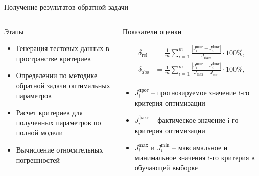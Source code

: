 \begin{frame}{Получение результатов обратной задачи}
	\begin{columns}
		\begin{column}{0.48\textwidth}
			\begin{block}{\scriptsize Этапы}
				\scriptsize
				\begin{itemize}
					\item Генерация тестовых данных в пространстве критериев
					\item Определении по методике обратной задачи оптимальных параметров
					\item Расчет критериев для полученных параметров по полной модели
					\item Вычисление относительных погрешностей
				\end{itemize}
			\end{block}
		\end{column}

		\begin{column}{0.52\textwidth}
			\begin{block}{\scriptsize Показатели оценки}
				\scriptsize
				\begin{center}
					\begin{equation*}
						\begin{aligned}
							\delta_{\text{rel}} & = \frac{1}{m} \sum_{i=1}^{m} \frac{ \left| J_i^{\text{прог}} - J_i^{\text{факт}} \right|}{J_{\text{факт}}} \cdot 100\%,                 \\
							\delta_{\text{abs}} & = \frac{1}{m} \sum_{i=1}^{m} \frac{ \left| J_i^{\text{прог}} - J_i^{\text{факт}} \right|}{J_{\text{max}} - J_{\text{min}}} \cdot 100\%, \\
						\end{aligned}
					\end{equation*}
				\end{center}
				\begin{itemize}
					\item $J_i^{\text{прог}}$ -- прогнозируемое значение i-го критерия оптимизации
					\item $J_i^{\text{факт}}$ -- фактическое значение i-го критерия оптимизации
					\item $J_i^{\max}$ и $J_i^{\min}$ -- максимальное и минимальное значения i-го критерия в обучающей выборке

				\end{itemize}
			\end{block}
		\end{column}
	\end{columns}
\end{frame}

